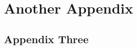 \documentclass[phd,appendix,figures]{uithesis}
\begin{document}
\chapter{Another Appendix}

\section{Appendix Three}
\blindtext



 
\end{document}
